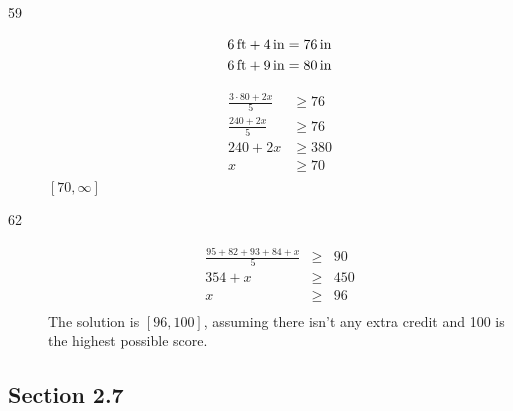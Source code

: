 \documentclass[letterpaper, landscape]{exam}
\begin{document}
\begin{description}
        \item[59]
          \begin{align*}
            \unit[6]{ft} + \unit[4]{in} &= \unit[76]{in} \\
            \unit[6]{ft} + \unit[9]{in} &= \unit[80]{in} \\
          \end{align*}

        \begin{align*}
          \frac{3 \cdot 80 + 2x}{5} & \geq 76 \\
          \frac{240 + 2x}{5}        & \geq 76 \\
          240 + 2x                  & \geq 380 \\
          x                         & \geq 70 \\
        \end{align*}
        $\boxed{ [70, \infty] }$

        \item[62]
          \begin{align*}
            \frac{95 + 82 + 93 + 84 + x}{5} & \geq & 90 \\
            354 + x                         & \geq & 450 \\
            x                               & \geq & 96 \\
          \end{align*}
          The solution is $[96, 100]$, assuming there isn't any extra credit and 100 is the highest possible score.
          
    \end{description}

    \subsection{Section 2.7} 
\end{document}
